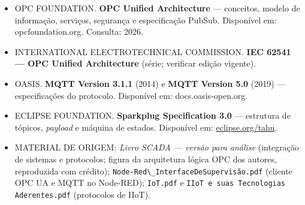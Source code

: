 \begin{itemize}
\tightlist
\item
  OPC FOUNDATION. \textbf{OPC Unified Architecture} --- conceitos, modelo de informação, serviços, segurança e especificação PubSub. Disponível em: opcfoundation.org. Consulta: 2026.
\item
  INTERNATIONAL ELECTROTECHNICAL COMMISSION. \textbf{IEC 62541 --- OPC Unified Architecture} (série; verificar edição vigente).
\item
  OASIS. \textbf{MQTT Version 3.1.1} (2014) e \textbf{MQTT Version 5.0} (2019) --- especificações do protocolo. Disponível em: docs.oasis-open.org.
\item
  ECLIPSE FOUNDATION. \textbf{Sparkplug Specification 3.0} --- estrutura de tópicos, \emph{payload} e máquina de estados. Disponível em: \url{eclipse.org/tahu}.
\item
  MATERIAL DE ORIGEM: \emph{Livro SCADA --- versão para análise} (integração de sistemas e protocolos;
  figura da arquitetura lógica OPC dos autores, reproduzida com crédito);
  \passthrough{\lstinline!Node-Red\_InterfaceDeSupervisão.pdf!} (cliente OPC UA e MQTT no Node-RED); \passthrough{\lstinline!IoT.pdf!} e
  \passthrough{\lstinline!IIoT e suas Tecnologias Aderentes.pdf!} (protocolos de IIoT).
\end{itemize}
